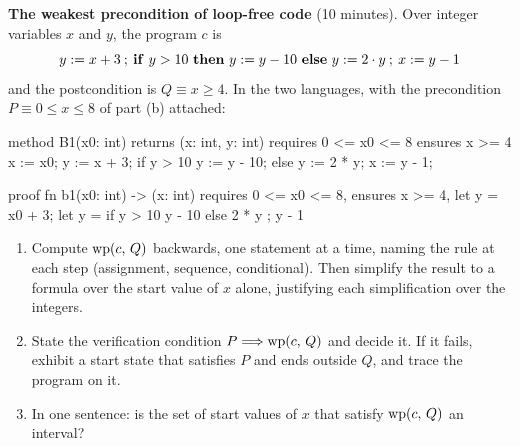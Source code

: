 \documentclass[11pt]{article}
\begin{document}
\begin{problem}\label{prob:B1}
\textbf{The weakest precondition of loop-free code} (10 minutes). Over integer
variables $x$ and $y$, the program $c$ is
\[
  y \assign x + 3 \seqc
  \mathbf{if}\ y > 10\ \mathbf{then}\ y \assign y - 10\ \mathbf{else}\ y \assign 2 \cdot y \seqc
  x \assign y - 1
\]
and the postcondition is $Q \equiv x \geq 4$. In the two languages, with the
precondition $P \equiv 0 \leq x \leq 8$ of part (b) attached:
\begin{dafnycode}
method B1(x0: int) returns (x: int, y: int)
  requires 0 <= x0 <= 8
  ensures x >= 4
{
  x := x0;
  y := x + 3;
  if y > 10 { y := y - 10; } else { y := 2 * y; }
  x := y - 1;
}
\end{dafnycode}
\begin{veruscode}
proof fn b1(x0: int) -> (x: int)
    requires 0 <= x0 <= 8,
    ensures x >= 4,
{
    let y = x0 + 3;
    let y = if y > 10 { y - 10 } else { 2 * y };
    y - 1
}
\end{veruscode}
\begin{enumerate}
\item[(a)] Compute $\mathrm{wp}(c,\,Q)$ backwards, one statement at a time, naming the
  rule at each step (assignment, sequence, conditional). Then simplify the
  result to a formula over the start value of $x$ alone, justifying each
  simplification over the integers.
\item[(b)] State the verification condition $P \Longrightarrow \mathrm{wp}(c,\,Q)$ and decide
  it. If it fails, exhibit a start state that satisfies $P$ and ends outside
  $Q$, and trace the program on it.
\item[(c)] In one sentence: is the set of start values of $x$ that satisfy
  $\mathrm{wp}(c,\,Q)$ an interval?
\end{enumerate}
\end{problem}
\end{document}
